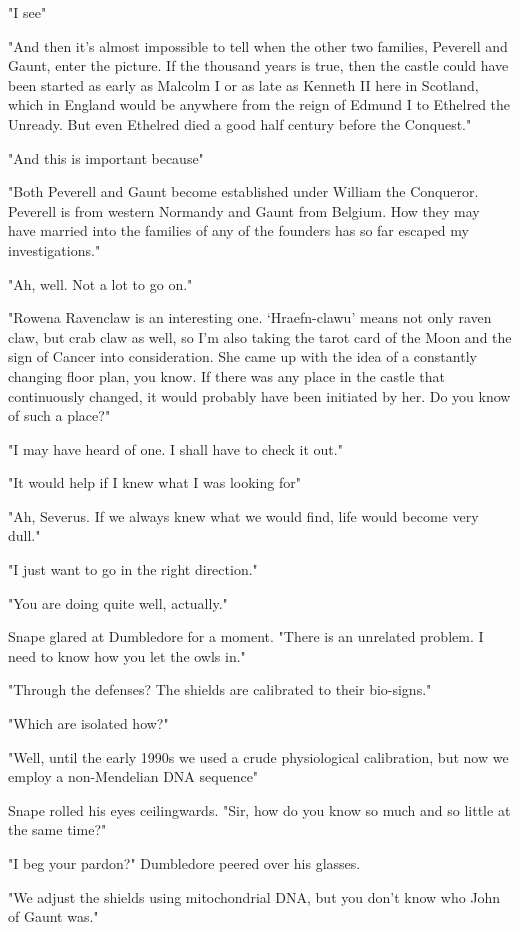 "I see{\el}"

"And then it's almost impossible to tell when the other two families, Peverell and Gaunt, enter the picture. If the thousand years is true, then the castle could have been started as early as Malcolm I or as late as Kenneth II here in Scotland, which in England would be anywhere from the reign of Edmund I to Ethelred the Unready. But even Ethelred died a good half century before the Conquest."

"And this is important because{\el}"

"Both Peverell and Gaunt become established under William the Conqueror. Peverell is from western Normandy and Gaunt from Belgium. How they may have married into the families of any of the founders has so far escaped my investigations."

"Ah, well. Not a lot to go on."

"Rowena Ravenclaw is an interesting one. `Hraefn-clawu' means not only raven claw, but crab claw as well, so I'm also taking the tarot card of the Moon and the sign of Cancer into consideration. She came up with the idea of a constantly changing floor plan, you know. If there was any place in the castle that continuously changed, it would probably have been initiated by her. Do you know of such a place?"

"I may have heard of one. I shall have to check it out."

"It would help if I knew what I was looking for{\el}"

"Ah, Severus. If we always knew what we would find, life would become very dull."

"I just want to go in the right direction."

"You are doing quite well, actually."

Snape glared at Dumbledore for a moment. "There is an unrelated problem. I need to know how you let the owls in."

"Through the defenses? The shields are calibrated to their bio-signs."

"Which are isolated how?"

"Well, until the early 1990s we used a crude physiological calibration, but now we employ a non-Mendelian DNA sequence{\el}"

Snape rolled his eyes ceilingwards. "Sir, how do you know so much and so little at the same time?"

"I beg your pardon?" Dumbledore peered over his glasses.

"We adjust the shields using mitochondrial DNA, but you don't know who John of Gaunt was."

